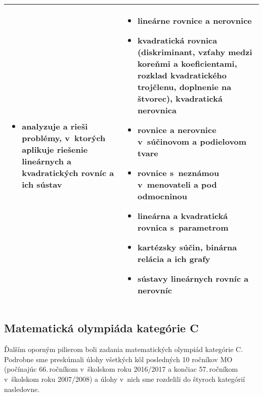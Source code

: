 \begin{longtable}{ p{} p{}}
\begin{itemize}
    \item analyzuje a rieši problémy, v~ktorých aplikuje riešenie lineárnych a kvadratických rovníc a ich sústav
  \end{itemize} & \vspace{-10pt}
  \begin{itemize}
    \item lineárne rovnice a nerovnice
    \item kvadratická rovnica (diskriminant, vzťahy medzi koreňmi a koeficientami, rozklad kvadratického trojčlenu, doplnenie na štvorec), kvadratická nerovnica
    \item rovnice a nerovnice v~súčinovom a podielovom tvare
    \item rovnice s~neznámou v~menovateli a pod odmocninou
    \item lineárna a kvadratická rovnica s~parametrom
    \item kartézsky súčin, binárna relácia a ich grafy
    \item sústavy lineárnych rovníc a nerovníc
  \end{itemize}\\ \bottomrule
\end{longtable}

\subsection*{Matematická olympiáda kategórie C}

Ďalším oporným pilierom boli zadania matematických olympiád kategórie C. Podrobne sme preskúmali úlohy všetkých kôl posledných 10 ročníkov MO (počínajúc 66.\,ročníkom v~školskom roku 2016/2017 a končiac 57.\,ročníkom v~školskom roku 2007/2008) a úlohy v~nich sme rozdelili do štyroch kategórií nasledovne.


